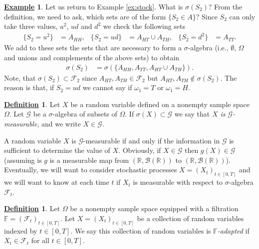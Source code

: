 \documentclass[12pt]{book}
\numberwithin{equation}{chapter}
\theoremstyle{plain}
\numberwithin{theorem}{section}
\theoremstyle{definition}
\newtheorem{definition}[theorem]{\underline{Definition}}
\newtheorem{example}[theorem]{\underline{Example}}
\numberwithin{exercise}{chapter}
\newcommand{\<}{\langle}
\renewcommand{\>}{\rangle}
\renewcommand{\(}{\left(}
\renewcommand{\)}{\right)}
\renewcommand{\[}{\left[}
\renewcommand{\]}{\right]}
\newcommand\Fb{\mathds{F}}
\newcommand\Rb{\mathds{R}}
\newcommand\Bc{\mathscr{B}}
\newcommand\Fc{\mathscr{F}}
\newcommand\Gc{\mathscr{G}}
\newcommand\om{\omega}
\newcommand\Om{\Omega}
\newcommand\sig{\sigma}
\begin{document}
\begin{example}
Let us return to Example \ref{ex:stock}.  What is $\sig(S_2)$?  From the definition, we need to ask, which sets are of the form $\{S_2 \in A\}$?  Since $S_2$ can only take three values, $u^2$, $ud$ and $d^2$ we check the following sets
\begin{align}
\{ S_2  = u^2 \}
	&= A_{HH} , &
\{ S_2 = u d \} 
	&= A_{HT} \cup A_{TH} , &
\{ S_2 = d^2 \} 
	&= A_{TT} .
\end{align}
We add to these sets the sets that are necessary to form a $\sig$-algebra (i.e., $\emptyset$, $\Om$ and unions and complements of the above sets) to obtain
\begin{align}
\sig(S_2)
	&=	\sig( \{ A_{HH}, A_{TT}, A_{HT} \cup A_{TH} \} ) .
\end{align}
Note, that $\sig(S_2) \subset \Fc_2$ since $A_{HT}, A_{TH} \in \Fc_2$ but $A_{HT}, A_{TH} \notin \sig(S_2)$.  The reason is that, if $S_2 = ud$ we cannot say if $\om_1 = T$ or $\om_1 = H$.  
\end{example}

\begin{definition}
Let $X$ be a random variable defined on a nonempty sample space $\Om$.  Let $\Gc$ be a $\sig$-algebra of subsets of $\Om$.  If $\sig(X) \subset \Gc$ we say that \emph{$X$ is $\Gc$-measurable}, and we write $X \in \Gc$.
\end{definition}

\noindent
A random variable  $X$ is $\Gc$-measurable if and only if the information in $\Gc$ is sufficient to determine the value of $X$.  Obviously, if $X \in \Gc$ then $g(X) \in \Gc$ (assuming is $g$ is a measurable map from $(\Rb,\Bc(\Rb))$ to $(\Rb,\Bc(\Rb))$).
\\[0.5em]
Eventually, we will want to consider stochastic processes $X=(X_t)_{t \in [0,T]}$ and we will want to know at each time $t$ if $X_t$ is measurable with respect to $\sig$-algebra $\Fc_t$.

\begin{definition}
Let $\Om$ be a nonempty sample space equipped with a filtration $\Fb=(\Fc_t)_{t \in [0,T]}$.  Let $X=(X_t)_{t \in [0,T]}$ be a collection of random variables indexed by $t \in [0,T]$.  We say this collection of random variables is \emph{$\Fb$-adapted} if $X_t \in \Fc_t$ for all $t \in [0,T]$.
\end{definition}

\end{document}
